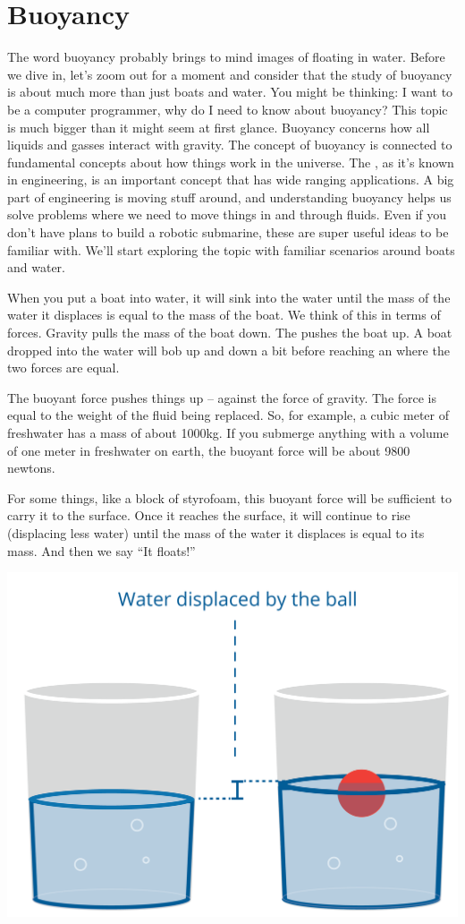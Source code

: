 \chapter{Buoyancy}

The word buoyancy probably brings to mind images of floating in water. Before we dive in, let's zoom out for a moment and consider that the study of buoyancy is about much more than just boats and water. You might be thinking: I want to be a computer programmer, why do I need to know about buoyancy? This topic is much bigger than it might seem at first glance. Buoyancy concerns how all liquids and gasses interact with gravity. The concept of buoyancy is connected to fundamental concepts about how things work in the universe. The , as it’s known in engineering, is an important concept that has wide ranging applications. A big part of engineering is moving stuff around, and understanding buoyancy helps us solve problems where we need to move things in and through fluids. Even if you don't have plans to build a robotic submarine, these are super useful ideas to be familiar with. We’ll start exploring the topic with familiar scenarios around boats and water.

When you put a boat into water, it will sink into the water until
the mass of the water it displaces is equal to the mass of the
boat. We think of this in terms of forces. Gravity pulls the mass of
the boat down. The  pushes the boat up. A boat
dropped into the water will bob up and down a bit before reaching an
 where the two forces are equal.

The buoyant force pushes things up -- against the force of
gravity. The force is equal to the weight of the fluid being
replaced. So, for example, a cubic meter of freshwater has a mass of
about 1000kg.  If you submerge anything with a volume of one meter in
freshwater on earth, the buoyant force will be about 9800 newtons.

For some things, like a block of styrofoam, this buoyant force will be
sufficient to carry it to the surface. Once it reaches the surface, it
will continue to rise (displacing less water) until the mass of the
water it displaces is equal to its mass. And then we say ``It floats!''

\includegraphics[width=.6\textwidth]{waterDisplacement.png}

